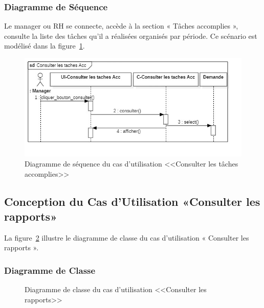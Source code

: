 \subsubsection{Diagramme de Séquence}
Le manager ou RH se connecte, accède à la section « Tâches accomplies », consulte la liste des tâches qu’il a réalisées organisés par période. Ce scénario est modélisé dans la figure~\ref{fig:seq_completed_tasks}.
\begin{figure}[h]
    \centering
    \includegraphics[width=13cm]{images/S_taches_accomplies.jpg}
    \caption{Diagramme de séquence du cas d'utilisation <<Consulter les tâches accomplies>>}
    \label{fig:seq_completed_tasks}
\end{figure}
\subsection{Conception du Cas d'Utilisation «Consulter les rapports»}
La figure~\ref{fig:class_consult_reports} illustre le diagramme de classe du cas d’utilisation « Consulter les rapports ».
\newpage
\subsubsection{Diagramme de Classe}
\begin{figure}[h]
     \centering
     \caption{Diagramme de classe du cas d'utilisation <<Consulter les rapports>>}
     \label{fig:class_consult_reports}
\end{figure}
